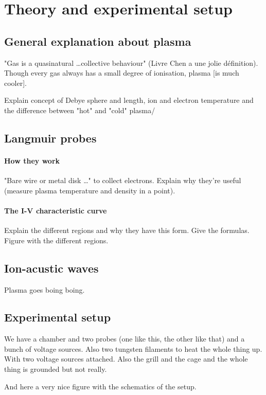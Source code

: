 \section{Theory and experimental setup}

\subsection{General explanation about plasma}
"Gas is a quasinatural \ldots collective behaviour" (Livre Chen a une jolie définition).
Though every gas always has a small degree of ionisation, plasma [is much cooler].

Explain concept of Debye sphere and length, ion and electron temperature and the difference between "hot" and "cold" plasma/


\subsection{Langmuir probes}
\paragraph{How they work}
"Bare wire or metal disk \ldots" to collect electrons.
Explain why they're useful (measure plasma temperature and density in a point).

\paragraph{The I-V characteristic curve}
Explain the different regions and why they have this form.
Give the formulas.
Figure with the different regions.


\subsection{Ion-acustic waves}
Plasma goes boing boing.

\subsection{Experimental setup}
We have a chamber and two probes (one like this, the other like that) and a bunch of voltage sources.
Also two tungsten filaments to heat the whole thing up.
With two voltage sources attached.
Also the grill and the cage and the whole thing is grounded but not really.

And here a very nice figure with the schematics of the setup.
